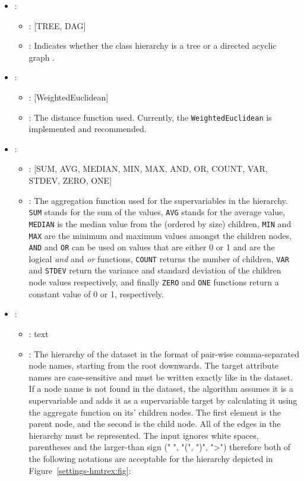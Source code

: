 \begin{itemize}
    \item {}:
           \begin{itemize}
                \item \optionPossibleValues{}: [TREE, DAG]
                \item \optionDescrption{}: Indicates whether the class hierarchy is a tree or a directed acyclic graph \cite{Vens08:jrnl}.
           \end{itemize}
    \item {}:
           \begin{itemize}
                \item \optionPossibleValues{}: [WeightedEuclidean]
                \item \optionDescrption{}: The distance function used. Currently, the {\tt WeightedEuclidean} is implemented and recommended.
           \end{itemize}
    \item {}:
           \begin{itemize}
                \item \optionPossibleValues{}: [SUM, AVG, MEDIAN, MIN, MAX, AND, OR, COUNT, VAR, STDEV, ZERO, ONE]
                \item \optionDescrption{}:  The aggregation function used for the supervariables in the hierarchy.  {\tt SUM} stands for the sum of the values, {\tt AVG} stands for the average value, {\tt MEDIAN} is the median value from the (ordered by size) children, {\tt MIN} and {\tt MAX} are the minimum and maximum values amongst the children nodes, {\tt AND} and {\tt OR} can be used on values that are either 0 or 1 and are the logical \textit{and} and \textit{or} functions, {\tt COUNT} returns the number of children, {\tt VAR} and {\tt STDEV} return the variance and standard deviation of the children node values respectively, and finally {\tt ZERO} and {\tt ONE} functions return a constant value of 0 or 1, respectively.
           \end{itemize}
    \item {}:
           \begin{itemize}
                \item \optionPossibleValues{}: text
                \item \optionDescrption{}: The hierarchy of the dataset in the format of pair-wise comma-separated node names, starting from the root downwards. The target attribute names are case-sensitive and must be written exactly like in the dataset. If a node name is not found in the dataset, the algorithm assumes it is a supervariable and adds it as a supervariable target by calculating it using the aggregate function on its' children nodes. The first element is the parent node, and the second is the child node. All of the edges in the hierarchy must be represented. The input ignores white spaces, parentheses and the larger-than sign (" ", "(", ")", "\textgreater") therefore both of the following notations are acceptable for the hierarchy depicted in Figure~\ref{settings-hmtrex:fig}:

\end{itemize}
\end{itemize}
